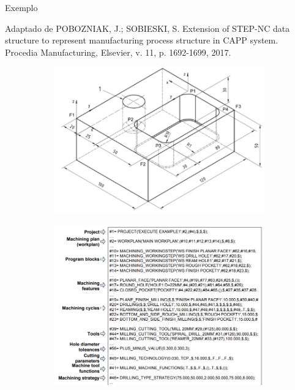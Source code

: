 \documentclass[aspectratio=169]{beamer}
\begin{document}
{%

\begin{frame}{Exemplo}

  Adaptado de POBOZNIAK, J.; SOBIESKI, S. Extension of STEP-NC data structure to represent
  manufacturing process structure in CAPP system. Procedia Manufacturing, Elsevier,
  v. 11, p. 1692-1699, 2017.

  \begin{figure}[H]
    \centering
    \begin{subfigure}[b]{0.46\textwidth}
        \includegraphics[width=\textwidth]{part1.png}
    \end{subfigure}
    \qquad
    \begin{subfigure}[b]{0.46\textwidth}
        \includegraphics[width=\textwidth]{step-nc-sample-1.png}
    \end{subfigure}
\end{figure}


\end{frame}}
\end{document}
